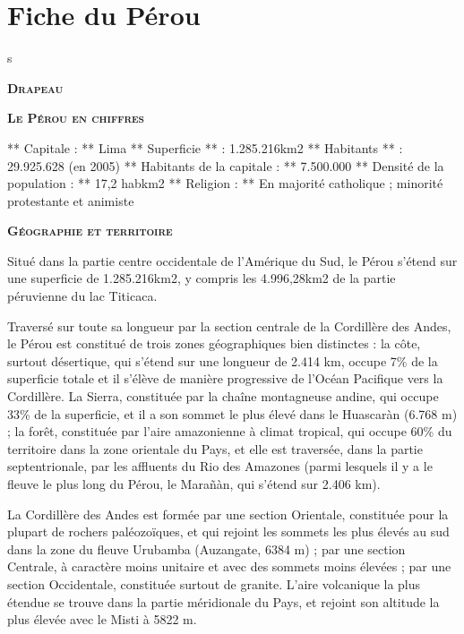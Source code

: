 \section{Fiche du Pérou}
s
\begin{multicols}{2}

\textbf{\textsc{Drapeau}}


\textbf{\textsc{Le Pérou en chiffres}}

** Capitale : ** Lima
** Superficie ** : 1.285.216km2
** Habitants ** : 29.925.628 (en 2005)
** Habitants de la capitale : ** 7.500.000
** Densité de la population : ** 17,2 habkm2
** Religion : ** En majorité catholique ; minorité protestante et animiste

\textbf{\textsc{Géographie et territoire}}

Situé dans la partie centre occidentale de l'Amérique du Sud, le Pérou s'étend sur une superficie de 1.285.216km2, y compris les 4.996,28km2 de la partie péruvienne du lac Titicaca.

Traversé sur toute sa longueur par la section centrale de la Cordillère des Andes, le Pérou est constitué de trois zones géographiques bien distinctes : la côte, surtout désertique, qui s'étend sur une longueur de 2.414 km, occupe 7\% de la superficie totale et il s'élève de manière progressive de l'Océan Pacifique vers la Cordillère. La Sierra, constituée par la chaîne montagneuse andine, qui occupe 33\% de la superficie, et il a son sommet le plus élevé dans le Huascaràn (6.768 m) ; la forêt, constituée par l'aire amazonienne à climat tropical, qui occupe 60\% du territoire dans la zone orientale du Pays, et elle est traversée, dans la partie septentrionale, par les affluents du Rio des Amazones (parmi lesquels il y a le fleuve le plus long du Pérou, le Marañàn, qui s'étend sur 2.406 km).

La Cordillère des Andes est formée par une section Orientale, constituée pour la plupart de rochers paléozoïques, et qui rejoint les sommets les plus élevés au sud dans la zone du fleuve Urubamba (Auzangate, 6384 m) ; par une section Centrale, à caractère moins unitaire et avec des sommets moins élevées ; par une section Occidentale, constituée surtout de granite. L'aire volcanique la plus étendue se trouve dans la partie méridionale du Pays, et rejoint son altitude la plus élevée avec le Misti à 5822 m.


\end{multicols}
